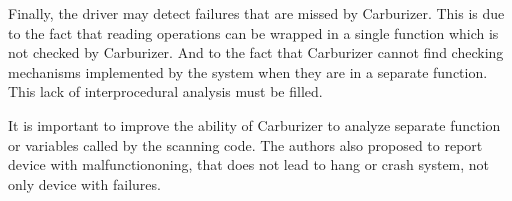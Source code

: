 \documentclass[11pt]{article}
\begin{document}






Finally, the driver may detect failures that are missed by Carburizer. This is due to the fact that reading operations can be wrapped in a single function which is not checked by Carburizer. And to the fact that Carburizer cannot find checking mechanisms implemented by the system when they are in a separate function. This lack of interprocedural analysis must be filled. 

It is important to improve the ability of Carburizer to analyze separate function or variables called by the scanning code. The authors also proposed to report device with malfunctiononing, that does not lead to hang or crash system, not only device with failures.
\end{document}
